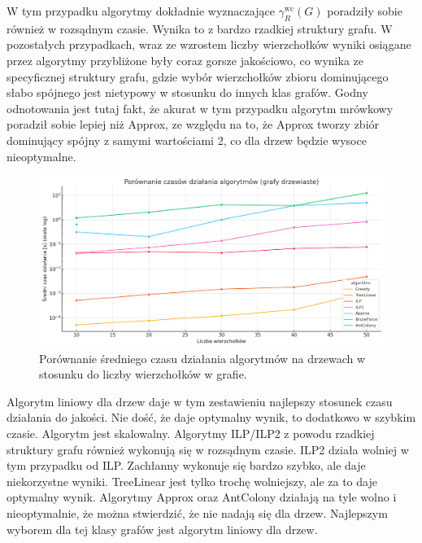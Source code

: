     W tym przypadku algorytmy dokładnie wyznaczające $\gamma^{\text{wc}}_R(G)$ poradziły sobie również w rozsądnym czasie. Wynika to z bardzo rzadkiej struktury grafu. W pozostałych przypadkach, wraz ze wzrostem liczby wierzchołków wyniki osiągane przez algorytmy przybliżone były coraz gorsze jakościowo, co wynika ze specyficznej struktury grafu, gdzie wybór wierzchołków zbioru dominującego słabo spójnego jest nietypowy w stosunku do innych klas grafów. Godny odnotowania jest tutaj fakt, że akurat w tym przypadku algorytm mrówkowy poradził sobie lepiej niż Approx, ze względu na to, że Approx tworzy zbiór dominujący spójny z samymi wartościami 2, co dla drzew będzie wysoce nieoptymalne.

    \begin{figure}[H]
        \centering
        \includegraphics[width=\textwidth]{assets/trees.png}
        \caption{Porównanie średniego czasu działania algorytmów na drzewach w stosunku do liczby wierzchołków w grafie.}
        \label{fig:treePlot}
    \end{figure}

    Algorytm liniowy dla drzew daje w tym zestawieniu najlepszy stosunek czasu działania do jakości. Nie dość, że daje optymalny wynik, to dodatkowo w szybkim czasie. Algorytm jest skalowalny. Algorytmy ILP/ILP2 z powodu rzadkiej struktury grafu również wykonują się w rozsądnym czasie. ILP2 działa wolniej w tym przypadku od ILP. Zachłanny wykonuje się bardzo szybko, ale daje niekorzystne wyniki. TreeLinear jest tylko trochę wolniejszy, ale za to daje optymalny wynik. Algorytmy Approx oraz AntColony działają na tyle wolno i nieoptymalnie, że można stwierdzić, że nie nadają się dla drzew. Najlepszym wyborem dla tej klasy grafów jest algorytm liniowy dla drzew.

